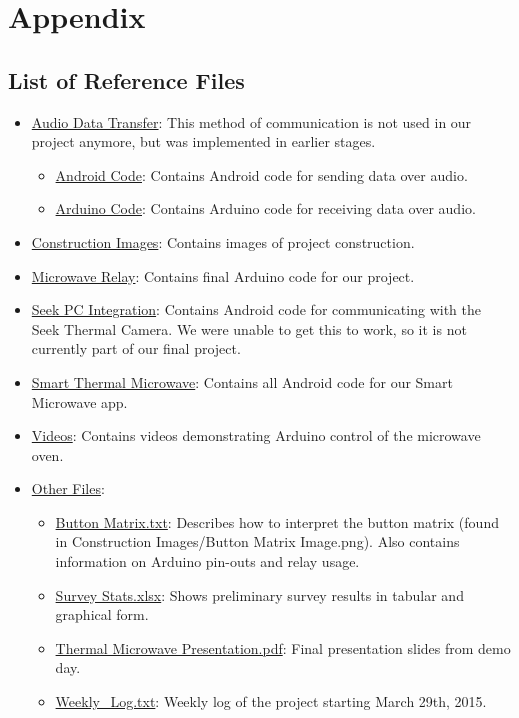 \documentclass[10pt,journal,letterpaper,twocolumn]{IEEEtran}
\begin{document}



\section{Appendix}

\subsection*{List of Reference Files}
\begin{itemize}
	\item \underline{Audio Data Transfer}: This method of communication is not used in our project anymore, but was implemented in earlier stages.
    \begin{itemize}
    	\item \underline{Android Code}: Contains Android code for sending data over audio.
    	\item \underline{Arduino Code}: Contains Arduino code for receiving data over audio.
    \end{itemize}
    \item \underline{Construction Images}: Contains images of project construction.
    \item \underline{Microwave Relay}: Contains final Arduino code for our project.
    \item \underline{Seek PC Integration}: Contains Android code for communicating with the Seek Thermal Camera.  We were unable to get this to work, so it is not currently part of our final project.
    \item \underline{Smart Thermal Microwave}: Contains all Android code for our Smart Microwave app.
	\item \underline{Videos}: Contains videos demonstrating Arduino control of the microwave oven.
    \item \underline{Other Files}:
    \begin{itemize}
      \item \underline{Button Matrix.txt}: Describes how to interpret the button matrix (found in Construction Images/Button Matrix Image.png).  Also contains information on Arduino pin-outs and relay usage.
      \item \underline{Survey Stats.xlsx}: Shows preliminary survey results in tabular and graphical form.
      \item \underline{Thermal Microwave Presentation.pdf}: Final presentation slides from demo day.
      \item \underline{Weekly\_Log.txt}: Weekly log of the project starting March 29th, 2015.
    \end{itemize}
\end{itemize}
\end{document}
